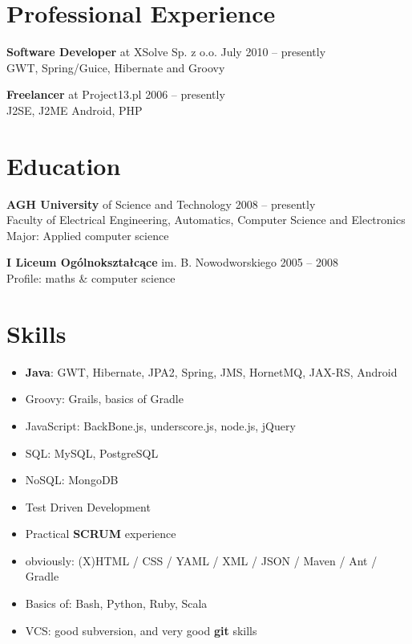 \documentclass{res}
\begin{document}
\begin{resume} 

\section{Professional Experience}
{\bf Software Developer} at XSolve Sp. z o.o. \hfill July 2010 – presently\\
	GWT, Spring/Guice, Hibernate and Groovy

{\bf Freelancer} at Project13.pl \hfill 2006 – presently\\
	J2SE, J2ME Android, PHP 

\section{Education} 
{\bf AGH University} of Science and Technology \hfill 2008 – presently\\
	Faculty of Electrical Engineering, Automatics, Computer Science and Electronics\\
	Major: Applied computer science

{\bf I Liceum Ogólnokształcące} im. B. Nowodworskiego \hfill 2005 – 2008\\
	Profile: maths \& computer science

\section{Skills}
\begin{itemize}
 \item \textbf{Java}: GWT, Hibernate, JPA2, Spring, JMS, HornetMQ, JAX-RS, Android
 \item Groovy: Grails, basics of Gradle
 \item JavaScript: BackBone.js, underscore.js, node.js, jQuery
 \item SQL: MySQL, PostgreSQL
 \item NoSQL: MongoDB 
 \item Test Driven Development
 \item Practical \textbf{SCRUM} experience
 \item obviously: (X)HTML / CSS / YAML / XML / JSON / Maven / Ant / Gradle
 \item Basics of: Bash, Python, Ruby, Scala
 \item VCS: good subversion, and very good \textbf{git} skills
\end{itemize}


\end{resume}
\end{document}
